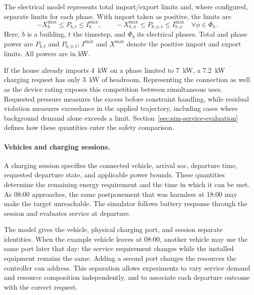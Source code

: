 \begin{samepage}
The electrical model represents total import/export limits and, where configured, separate limits for each phase. With import taken as positive, the limits are
\begin{equation}
-X_b^{\max}\leq P_{b,t}\leq I_b^{\max},\qquad
-X_{b,\phi}^{\max}\leq P_{b,\phi,t}\leq I_{b,\phi}^{\max}\quad\forall\phi\in\Phi_b.
\label{eq:sim-electrical-limits}
\end{equation}
Here, $b$ is a building, $t$ the timestep, and $\Phi_b$ its electrical phases. Total and phase power are $P_{b,t}$ and $P_{b,\phi,t}$; $I^{\max}$ and $X^{\max}$ denote the positive import and export limits. All powers are in kW.\par
\end{samepage}

If the house already imports \SI{4}{\kilo\watt} on a phase limited to \SI{7}{\kilo\watt}, a \SI{7.2}{\kilo\watt} charging request has only \SI{3}{\kilo\watt} of headroom. Representing the connection as well as the device rating exposes this competition between simultaneous uses. Requested pressure measures the excess before constraint handling, while residual violation measures exceedance in the applied trajectory, including cases where background demand alone exceeds a limit. Section~\ref{sec:sim-service-evaluation} defines how these quantities enter the safety comparison.

\paragraph{Vehicles and charging sessions.}
A charging session specifies the connected vehicle, arrival \gls{soc}, departure time, requested departure state, and applicable power bounds. These quantities determine the remaining energy requirement and the time in which it can be met. As 08:00 approaches, the same postponement that was harmless at 18:00 may make the target unreachable. The simulator follows battery response through the session and evaluates service at departure.

The model gives the vehicle, physical charging port, and session separate identities. When the example vehicle leaves at 08:00, another vehicle may use the same port later that day: the service requirement changes while the installed equipment remains the same. Adding a second port changes the resources the controller can address. This separation allows experiments to vary service demand and resource composition independently, and to associate each departure outcome with the correct request.

